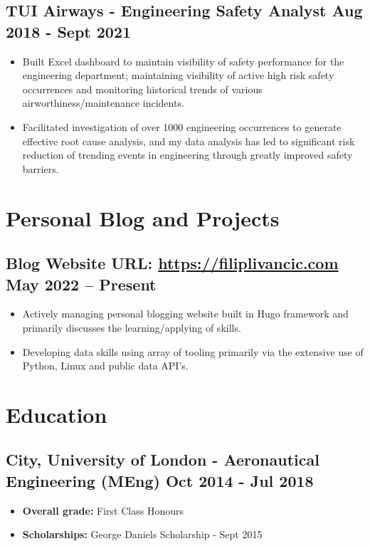 \documentclass[a4paper,9pt]{article}
\begin{document}
\subsection*{\textbf{TUI Airways - Engineering Safety Analyst} \hfill  Aug 2018 - Sept 2021}
\begin{itemize}[noitemsep]
	\item Built Excel dashboard to maintain visibility of safety performance for the engineering department; maintaining visibility of active high risk safety occurrences and monitoring historical trends of various airworthiness/maintenance incidents.
	\item Facilitated investigation of over 1000 engineering occurrences to generate effective root cause analysis, and my data analysis has led to significant risk reduction of trending events in engineering through greatly improved safety barriers.
\end{itemize}

\section*{Personal Blog and Projects}

\subsection*{\textbf{Blog Website URL}: \url{https://filiplivancic.com} \hfill  May 2022 – Present}
\begin{itemize}[noitemsep]
	\item  Actively managing personal blogging website built in Hugo framework and primarily discusses the learning/applying of skills.
    \item  Developing data skills using array of tooling primarily via the extensive use of Python, Linux and public data API's.
\end{itemize}

\section*{Education}
\subsection*{\textbf {City, University of London - Aeronautical Engineering (MEng)}  \hfill Oct 2014 - Jul 2018}\FloatBarrier
\begin{itemize}[noitemsep]
	\item \textbf{Overall grade:} First Class Honours %
	\item \textbf{Scholarships:} George Daniels Scholarship - Sept 2015
\end{itemize}
\end{document}
